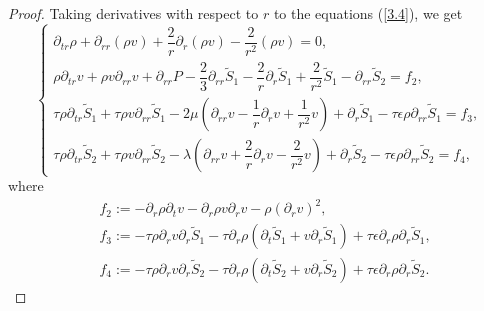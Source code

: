 \documentclass[10pt,reqno]{amsart}
\numberwithin{equation}{section}
\begin{document}
	\begin{proof}
		Taking derivatives with respect to $r$ to the equations (\ref{3.4}), we get
		\begin{equation}\label{22}
			\begin{cases}
				\partial_{tr} \rho+\partial_{rr}(\rho v)+\dfrac{2}{r} \partial_r(\rho v)-\dfrac{2}{r^2} (\rho v)=0, \\
				\rho\partial_{tr} v+\rho v \partial_{rr} v+\partial_{rr} P-\dfrac{2}{3}\partial_{rr}  \tilde{S}_1-\dfrac{2}{r} \partial_r \tilde{S}_1+\dfrac{2}{r^2}\tilde{S}_1-\partial_{rr} \tilde{S}_2=f_2,\\
				\tau   \rho \partial_{tr} \tilde{S}_1+\tau   \rho v \partial_{rr}\tilde{S}_1 
				-2\mu\left(\partial_{rr} v- \dfrac{1}{r}\partial_r v
				+\dfrac{1}{r^2} v \right)+\partial_r \tilde{S}_1-\tau   \epsilon\rho\partial_{rr}\tilde{S}_1= f_3, \\
				\tau  \rho \partial_{tr} \tilde{S}_2+\tau  \rho v \partial_{rr}\tilde{S}_2
				-\lambda \left(\partial_{rr} v+\dfrac{2}{r}\partial_r v-\dfrac{2}{r^2} v\right)+\partial_r \tilde{S}_2-\tau  \epsilon\rho\partial_{rr}\tilde{S}_2=f_4,
			\end{cases}
		\end{equation}
		where
		\begin{equation}
			\begin{aligned}\nonumber
				&f_2:=-\partial_r \rho \partial_t v-\partial_r \rho v \partial_r v-\rho (\partial_{r}v)^2,\\
				&f_3:=-\tau   \rho\partial_r v\partial_r \tilde{S}_1
				-\tau   \partial_r \rho \left(\partial_t \tilde{S}_1+v\partial_r\tilde{S}_1 \right)+\tau   \epsilon\partial_{r}\rho\partial_r\tilde{S}_1,\\
				&f_4:=-\tau  \rho\partial_r v\partial_r \tilde{S}_2
				-\tau  \partial_r \rho \left(\partial_t \tilde{S}_2+v\partial_r\tilde{S}_2 \right)+\tau  \epsilon\partial_{r}\rho\partial_r\tilde{S}_2.
			\end{aligned}
		\end{equation}
		

\end{proof}
\end{document}
